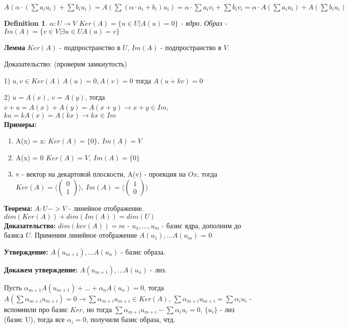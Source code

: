 \documentclass[12pt]{article}
\newtheorem{definition}{Definition}
\begin{document}
  $A(\alpha\cdot (\sum a_iu_i)+\sum b_iu_i)=A(\sum(\alpha\cdot a_i+b_i)u_i)=\alpha\cdot \sum a_iv_i+\sum b_iv_i=\alpha \cdot A(\sum a_iu_i)+A(\sum b_iu_i)
$  \\

  \begin{definition}
      $\alpha : U \rightarrow V$ $Ker(A) = \{ u \in U | A(u) = 0\}$ - ядро. Образ - $Im(A) = \{v \in V | \exists u \in U A(u) = v \}$
  \end{definition} 

  \textbf{Лемма} $Ker(A)$ - подпространство в $U$, $Im(A)$ - подпространство в $V$.

  Доказательство: (проверим замкнутость)
  
  1) $u, v \in Ker(A) \ A(u) = 0, A(v) = 0$ тогда $A(u + kv) = 0$

  2) $u = A(x),\ v = A(y)$, тогда $v + u = A(x) + A(y) = A(x + y) \rightarrow x + y \in Im$, $ku = kA(x) = A(kx) \rightarrow kx \in Im$
\\

\textbf{Примеры:} \begin{enumerate}
    \item A(x) = x: $Ker(A) = \{0\},\ Im(A) = V$
    \item A(x) = 0 $Ker(A) = V,\ Im(A) = \{0\}$
    \item v - вектор на декартовой плоскости, A(v) - проекция на $Ox$, тогда $Ker(A) = \langle \begin{pmatrix}
        0 \\
        1
    \end{pmatrix} \rangle,\ Im(A) = \langle \begin{pmatrix}
        1 \\
        0
    \end{pmatrix} \rangle$
\end{enumerate}

  \textbf{Теорема:} $A: U -> V$ - линейное отображение. $dim(Ker(A))+ dim(Im(A)) = dim(U)$
\\

  \textbf{Доказательство:} $dim(ker(A)) = m$ - $u_1, ..., u_m$ - базис ядра, дополним до базиса $U$. Применим линейное отображение $A(u_1), ... A(u_m)$ = 0
  
  \textbf{Утверждение:} $A(u_{m+1}), ... A(u_{n})$ - базис образа.
  
  \textbf{Докажем утверждение:} $A(u_{m+1}), ... A(u_{n})$ - лнз.

  Пусть $\alpha_{m + 1} A(u_{m + 1}) + ... + \alpha_{n} A(u_{n}) = 0$, тогда $A(\sum {\alpha_{m + i}u_{m + i}}) = 0 \rightarrow \sum {\alpha_{m + i}u_{m + i}} \in Ker(A)$, $\sum {\alpha_{m + i}u_{m + i}} = \sum {\alpha_{i}u_{i}}$ - вспомнили про базис $Ker$, но тогда $\sum {\alpha_{m + i}u_{m + i}} - \sum {\alpha_{i}u_{i}} = 0$, $\{u_i\}$ - лнз (базис U), тогда все $\alpha_i = 0$, получили базис образа, чтд.
\end{document}
